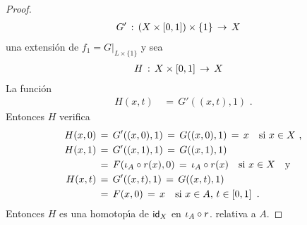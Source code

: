 \begin{proof}
\begin{align*}
		G' & \,:\,(X\times\intervalo)\times\{1\}\,\rightarrow\,X
	\end{align*}
	una extensi\'{o}n de $f_{1}=G|_{L\times\{1\}}$ y sea
	\begin{align*}
		H & \,:\,X\times\intervalo\,\rightarrow\,X
	\end{align*}
	La funci\'{o}n
	\begin{align*}
		H(x,t) & \,=\,G'((x,t),1)
		\text{ .}
	\end{align*}
	Entonces $H$ verifica
	\begin{equation}
		\label{eq:extensiondehomotopiasydeformacionesfuerte}
	\begin{aligned}
		H(x,0) & \,=\,G'((x,0),1)\,=\,G((x,0),1) \,=\,x
			\quad\text{si }x\in X \text{ ,} \\
		H(x,1) & \,=\,G'((x,1),1)\,=\,G((x,1),1) \\
		& \,=\,F(\inc[A]\circ r(x),0) \,=\,\inc[A]\circ r(x)
			\quad\text{si }x\in X\quad\text{y} \\
		H(x,t) & \,=\,G'((x,t),1)\,=\,G((x,t),1) \\
		& \,=\,F(x,0)\,=\,x
			\quad\text{si }x\in A,\,t\in\intervalo
		\text{ .}
	\end{aligned}
	\end{equation}
	Entonces $H$ es una homotop\'{\i}a de $\id[X]$ en $\inc[A]\circ r$.
	relativa a $A$.
\end{proof}
